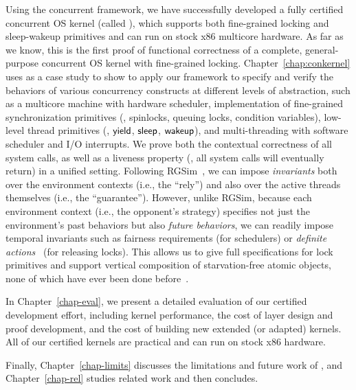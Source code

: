  Using the concurrent \CTOS framework, we have successfully developed a fully certified
  concurrent OS kernel (called {\bf \cCTOS}),
which  supports both fine-grained locking and sleep-wakeup primitives and
  can run on stock x86 multicore hardware.
  As far as we 
  know, this is the first proof of functional correctness of a complete,
  general-purpose concurrent OS kernel with fine-grained locking.
  Chapter~\ref{chap:conkernel} uses \cCTOS{}
  as a case study to show to apply our framework
  to specify and verify the behaviors of various concurrency
  constructs at different levels of abstraction, such as a multicore
  machine with hardware scheduler, implementation of fine-grained
  synchronization primitives (\eg, spinlocks, queuing locks,
  condition variables), low-level thread primitives (\eg, $\mathsf{yield}$,
  $\mathsf{sleep}$, $\mathsf{wakeup}$), and multi-threading with software scheduler and I/O
  interrupts.
  We prove both the contextual
  correctness of all system calls, as well as a liveness property 
  (\ie,  all system calls will eventually return)
  in a unified setting.
  Following RGSim~\cite{RGSim}, we can impose
  {\em invariants} both over the environment contexts (i.e., the ``rely'')
  and also over the active threads themselves (i.e., the ``guarantee'').
  However, unlike RGSim,
  because each environment context (i.e., the opponent's strategy)
  specifies not just the environment's past behaviors
  but also {\em future behaviors}, we can readily impose temporal
  invariants such as fairness requirements (for schedulers) or
  {\em definite actions}~\cite{lili16} (for releasing locks). This allows
  us to give full specifications for lock primitives and support vertical
  composition of starvation-free atomic objects, none of which have ever
  been done before~\cite{lili16}.
    
    
In Chapter~\ref{chap-eval},   we present a detailed evaluation of our certified development
  effort, including kernel performance, the cost of
  layer design and proof development,
  and the cost of building new extended (or adapted)
  kernels. All of our certified kernels are practical and can run on stock
  x86 hardware. 
    
 Finally, Chapter~\ref{chap-limits} discusses
 the limitations and future work of \CTOS{},
 and Chapter~\ref{chap-rel}
 studies related work and then concludes.





